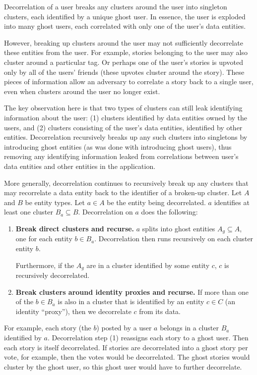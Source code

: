 Decorrelation of a user breaks any clusters around the user into singleton clusters, each identified
by a unique ghost user. In essence, the user is exploded into many ghost users, each correlated with
only one of the user's data entities.

However, breaking up clusters around the user may not sufficiently decorrelate these entities from
the user. For example, stories belonging to the user may also cluster around a particular tag. Or
perhaps one of the user's stories is upvoted only by all of the users' friends (these upvotes
cluster around the story). These pieces of information allow an adversary to correlate a story back
to a single user, even when clusters around the user no longer exist.

The key observation here is that two types of clusters can still leak identifying information about
the user: (1) clusters identified by data entities owned by the users, and (2) clusters consisting
of the user's data entities, identified by other entities. Decorrelation recursively breaks up any
such clusters into singletons by introducing ghost entities (as was done with introducing ghost
users), thus removing any identifying information leaked from correlations between user's data
entities and other entities in the application.

More generally, decorrelation continues to recursively break up any clusters that may recorrelate a
data entity back to the identifier of a broken-up cluster. Let $A$ and $B$ be entity types. Let $a
\in A$ be the entity being decorrelated. $a$ identifies at least one cluster $B_a \subseteq B$.
Decorrelation on $a$ does the following: 
\begin{enumerate} 
    
    \item \textbf{Break direct clusters and
            recurse.} $a$ splits into ghost entities $A_g \subseteq A$, one for each entity $b\in B_a$.
            Decorrelation then runs recursively on each cluster entity $b$.
            
            Furthermore, if the $A_g$ are in a cluster identified by some entity $c$, $c$ is
            recursively decorrelated.

    \item \textbf{Break clusters around identity proxies and recurse.} If more than one of the
        $b \in B_a$ is also in a cluster that is identified by an entity $c \in C$ (an identity
        ``proxy''), then we decorrelate $c$ from its data. 
        
\end{enumerate}
For example, each story (the $b$) posted by a user $a$ belongs in a cluster $B_a$ identified by $a$.
Decorrelation step (1) reassigns each story to a ghost user. Then each story is itself decorrelated.
If stories are decorrelated into a ghost story per vote, for example, then the votes would be
decorrelated. The ghost stories would cluster by the ghost user, so this ghost user would have to
further decorrelate.

